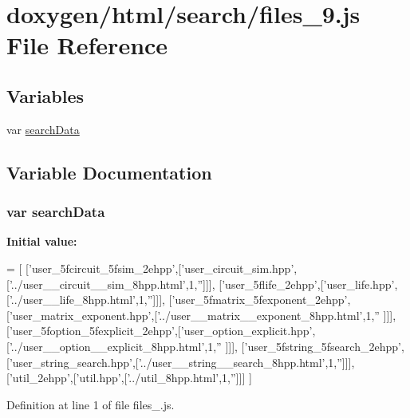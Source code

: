 \hypertarget{a00082}{}\section{doxygen/html/search/files\+\_\+9.js File Reference}
\label{a00082}
\subsection*{Variables}
\begin{DoxyCompactItemize}
\item 
var \hyperlink{a00082_ad01a7523f103d6242ef9b0451861231e}{search\+Data}
\end{DoxyCompactItemize}


\subsection{Variable Documentation}
\hypertarget{a00082_ad01a7523f103d6242ef9b0451861231e}{}
\subsubsection[{search\+Data}]{\setlength{\rightskip}{0pt plus 5cm}var search\+Data}\label{a00082_ad01a7523f103d6242ef9b0451861231e}
{\bfseries Initial value\+:}
\begin{DoxyCode}
=
[
  [\textcolor{stringliteral}{'user\_5fcircuit\_5fsim\_2ehpp'},[\textcolor{stringliteral}{'user\_circuit\_sim.hpp'},[\textcolor{stringliteral}{'../user\_\_circuit\_\_sim\_8hpp.html'},1,\textcolor{stringliteral}{''}]]],
  [\textcolor{stringliteral}{'user\_5flife\_2ehpp'},[\textcolor{stringliteral}{'user\_life.hpp'},[\textcolor{stringliteral}{'../user\_\_life\_8hpp.html'},1,\textcolor{stringliteral}{''}]]],
  [\textcolor{stringliteral}{'user\_5fmatrix\_5fexponent\_2ehpp'},[\textcolor{stringliteral}{'user\_matrix\_exponent.hpp'},[\textcolor{stringliteral}{'../user\_\_matrix\_\_exponent\_8hpp.html'},1,\textcolor{stringliteral}{''}
      ]]],
  [\textcolor{stringliteral}{'user\_5foption\_5fexplicit\_2ehpp'},[\textcolor{stringliteral}{'user\_option\_explicit.hpp'},[\textcolor{stringliteral}{'../user\_\_option\_\_explicit\_8hpp.html'},1,\textcolor{stringliteral}{''}
      ]]],
  [\textcolor{stringliteral}{'user\_5fstring\_5fsearch\_2ehpp'},[\textcolor{stringliteral}{'user\_string\_search.hpp'},[\textcolor{stringliteral}{'../user\_\_string\_\_search\_8hpp.html'},1,\textcolor{stringliteral}{''}]]],
  [\textcolor{stringliteral}{'util\_2ehpp'},[\textcolor{stringliteral}{'util.hpp'},[\textcolor{stringliteral}{'../util\_8hpp.html'},1,\textcolor{stringliteral}{''}]]]
]
\end{DoxyCode}


Definition at line 1 of file files\+\_.\+js.

